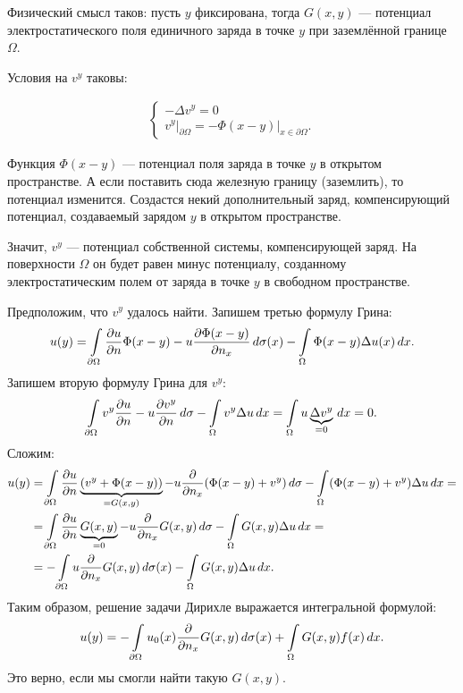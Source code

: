 Физический смысл таков: пусть $y$ фиксирована, тогда $G(x,y)$ --- потенциал электростатического поля единичного заряда в точке $y$ при заземлённой границе $\Omega$.

Условия на $v^y$ таковы:

\begin{align*}
	\begin{cases*}
		- \Delta v^y = 0 \\
		v^y\Big\rvert_{\partial \Omega} = - \Phi(x-y)\Big\rvert_{x \in \partial \Omega}.
	\end{cases*}
\end{align*}

Функция $\Phi(x-y)$ --- потенциал поля заряда в точке $y$ в открытом пространстве. А если поставить сюда железную границу (заземлить), то потенциал изменится. Создастся некий дополнительный заряд, компенсирующий потенциал, создаваемый зарядом $y$ в открытом пространстве.

Значит, $v^y$ --- потенциал собственной системы, компенсирующей заряд. На поверхности $\Omega$ он будет равен минус потенциалу, созданному электростатическим полем от заряда в точке $y$ в свободном пространстве.

Предположим, что $v^y$ удалось найти. Запишем третью формулу Грина:
$$ u(y) = \int \limits_{\partial \Omega} \pder[u]{n} \Phi (x-y) - u \pder[\Phi(x-y)]{n_x} \, d\sigma(x) - \int \limits_\Omega \Phi (x -y) \Delta u(x) \, dx.$$
Запишем вторую формулу Грина для $v^y$:
$$ \int \limits_{\partial \Omega} v^y \pder[u]{n} - u \pder[v^y]{n} \, d\sigma - \int \limits_\Omega v^y \Delta u \, dx = \int \limits_{\Omega} u \underbrace{\Delta v^y}_{ = 0} \, dx = 0.$$
Сложим:
\begin{align*}
	u(y) & = \int \limits_{\partial \Omega} \pder[u]{n} \underbrace{(v^y + \Phi (x-y))}_{=G(x,y)} - u \pder{n_x} (\Phi (x-y) + v^y) \, d\sigma - \int \limits_\Omega (\Phi (x-y) + v^y) \Delta u \, dx = \\
	& = \int \limits_{\partial \Omega} \pder[u]{n} \underbrace{G(x,y)}_{=0} - u \pder{n_x} G(x,y) \, d\sigma - \int \limits_\Omega G(x,y) \Delta u \, dx = \\
	& = - \int \limits_{\partial \Omega} u \pder{n_x} G(x,y) \, d\sigma(x) - \int \limits_\Omega G(x,y) \Delta u \, dx.
\end{align*}
Таким образом, решение задачи Дирихле выражается интегральной формулой:
$$ u(y) = - \int \limits_{\partial \Omega} u_0(x) \pder{n_x} G(x,y) \, d\sigma(x) + \int \limits_\Omega G(x,y) f(x) \, dx.$$
Это верно, если мы смогли найти такую $G(x,y)$.

